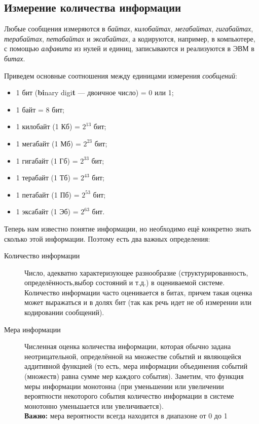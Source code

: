 \subsection{Измерение количества информации}\label{subsec:measuring-information-quantity}

Любые сообщения измеряются в \emph{байтах}, \emph{килобайтах}, \emph{мегабайтах}, \emph{гигабайтах}, \emph{терабайтах}, \emph{петабайтах} и \emph{эксабайтах}, а кодируются, например, в компьютере, с помощью \emph{алфавита} из нулей и единиц, записываются и реализуются в ЭВМ в \emph{битах}.

Приведем основные соотношения между единицами измерения \emph{сообщений}:
\begin{itemize}
    \item 1 бит (\textbf{bi}nary digi\textbf{t} --- двоичное число) = 0 или 1;
    \item 1 байт = 8 бит;
    \item 1 килобайт (1 Кб) = $2^{13}$ бит;
    \item 1 мегабайт (1 Мб) = $2^{23}$ бит;
    \item 1 гигабайт (1 Гб) = $2^{33}$ бит;
    \item 1 терабайт (1 Тб) = $2^{43}$ бит;
    \item 1 петабайт (1 Пб) = $2^{53}$ бит;
    \item 1 эксабайт (1 Эб) = $2^{63}$ бит.
\end{itemize}

Теперь нам известно понятие информации, но необходимо ещё конкретно знать сколько этой информации. Поэтому есть два важных определения:

\begin{description}
    \item [Количество информации]
          Число, адекватно характеризующее разнообразие (структурированность, определённость,выбор состояний и т.д.) в оцениваемой системе. Количество информации часто оценивается в битах, причем такая оценка может выражаться и в долях бит (так как речь идет не об измерении или кодировании сообщений).

    \item [Мера информации]
          Численная оценка количества информации, которая обычно задана неотрицательной, определённой на множестве событий и являющейся аддитивной функцией (то есть, мера информации объединения событий (множеств) равна сумме мер каждого события). Заметим, что функция меры информации монотонна (при уменьшении или увеличении вероятности некоторого события количество информации в системе монотонно уменьшается или увеличивается). \\
          \textbf{Важно:} мера вероятности всегда находится в диапазоне от 0 до 1
\end{description}

